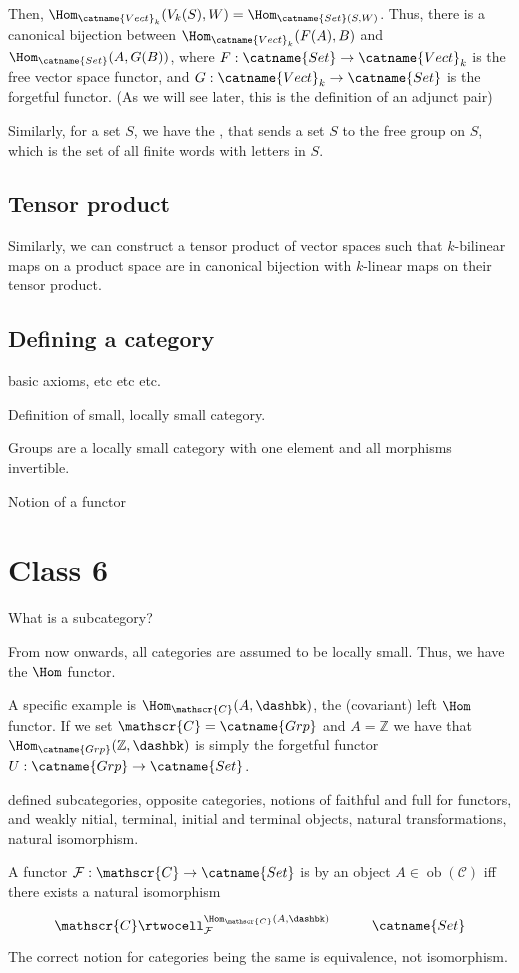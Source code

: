 \documentclass[12pt]{scrartcl}
\DeclareMathOperator{\ob}{ob}
\begin{document}
Then, $\Hom_{\catname{Vect}_k}(V_k(S), W) = \Hom_{\catname{Set}(S, W)}$.
Thus, there is a canonical bijection between $\Hom_{\catname{Vect}_k }(F(A), B)$ and $\Hom_{\catname{Set} }(A, G(B))$, where $F: \catname{Set} \to \catname{Vect}_k$ is the free vector space functor, and $G: \catname{Vect}_k \to \catname{Set} $ is the forgetful functor.
(As we will see later, this is the definition of an adjunct pair)

Similarly, for a set $S$, we have the , that sends a set $S$ to the free group on $S$, which is the set of all finite words with letters in $S$. 

\subsection{Tensor product}

Similarly, we can construct a tensor product of vector spaces such that $k$-bilinear maps on a product space are in canonical bijection with $k$-linear maps on their tensor product.

\subsection{Defining a category}
basic axioms, etc etc etc.

Definition of small, locally small category.

Groups are a locally small category with one element and all morphisms invertible.

Notion of a functor

\section{Class 6}
What is a subcategory? 

From now onwards, all categories are assumed to be locally small.
Thus, we have the $\Hom$ functor.

A specific example is $\Hom_{\mathscr{C}}(A, \dashbk)$, the (covariant) left $\Hom$ functor. 
If we set $\mathscr{C} = \catname{Grp}$ and $A = \mathbb{Z}$  we have that $\Hom_{\catname{Grp} }(\mathbb{Z}, \dashbk)$ is simply the forgetful functor $U: \catname{Grp} \to \catname{Set} $.  

defined subcategories, opposite categories, notions of faithful and full for functors, and weakly nitial, terminal, initial and terminal objects, natural transformations, natural isomorphism.

A functor $\mathcal{F}: \mathscr{C} \to \catname{Set} $ is  by an object $A \in \ob(\mathscr{C})$ iff there exists a natural isomorphism 
\[
	\xymatrix{
	\mathscr{C} \rtwocell^{\Hom_{\mathscr{C}}(A, \dashbk)}_{\mathcal{F}} &  \catname{Set} \\ 
	}
\] 
The correct notion for categories being the same is equivalence, not isomorphism.
\end{document}
